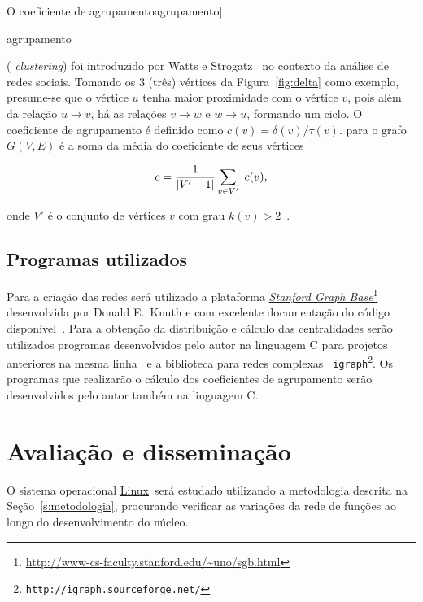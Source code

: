 \documentclass[a4paper,12pt,twoside]{article}
\def\linux{\href{http://www.kernel.org/}{\sc Linux}}
\def\degreelabel{k}
\def\degree#1{\degreelabel(#1)}
\renewcommand\marginpar[1]{}
\let\oldmarginpar\marginpar
\renewcommand\marginpar[1]{\-\oldmarginpar[\raggedleft\footnotesize #1]%
{\raggedright\footnotesize #1}}
\begin{document}
O coeficiente de agrupamento\marginpar{agrupamento} ({\em
  clustering\/}) foi introduzido por Watts e
Strogatz~\cite{watts-1998} no contexto da análise de redes
sociais. Tomando os 3 (três) vértices da Figura~\ref{fig:delta} como
exemplo, presume-se que o vértice $u$ tenha maior proximidade com o
vértice $v$, pois além da relação $u\longrightarrow v$, há as relações
$v\longrightarrow w$ e $w\longrightarrow u$, formando um ciclo.  O
coeficiente de agrupamento é definido como $
c(v)=\delta(v)/\tau(v)$.  %
para o grafo $G(V,E)$ é a soma da média do coeficiente de seus
vértices

\begin{displaymath}
  \label{eq:clustering}
  c = {1\over |V'-1|} \sum_{v \in V'}\ c(v),
\end{displaymath}

\noindent onde $V'$ é o conjunto de vértices $v$ com grau $\degree{v}>2$~\cite{schank-2005}. 

\subsection{Programas utilizados}

Para a criação das redes será utilizado a plataforma
\textit{\href{http://www-cs-faculty.stanford.edu/~uno/sgb.html}{Stanford
    Graph
    Base}}\footnote{\url{http://www-cs-faculty.stanford.edu/~uno/sgb.html}}
desenvolvida por Donald E.\ Knuth e com excelente documentação do
código disponível~\cite{sgb1993}. Para a obtenção da distribuição e
cálculo das centralidades serão utilizados programas desenvolvidos
pelo autor na linguagem {\sc C} para projetos anteriores na mesma
linha~\cite{cnet:thesaurus, cnet:culinary, arxvi:h} e a biblioteca
para redes complexas \href{http://igraph.sourceforge.net/}{\tt
  igraph\footnote{\url{http://igraph.sourceforge.net/}}}. Os programas
que realizarão o cálculo dos coeficientes de agrupamento serão
desenvolvidos pelo autor também na linguagem {\sc C}.


\section{Avaliação e disseminação}
\label{s:publicacao}
\label{s:analise}

O sistema operacional \linux\ será estudado utilizando a metodologia
descrita na Seção~\ref{s:metodologia}, procurando verificar as
variações da rede de funções ao longo do desenvolvimento do núcleo.
\end{document}
